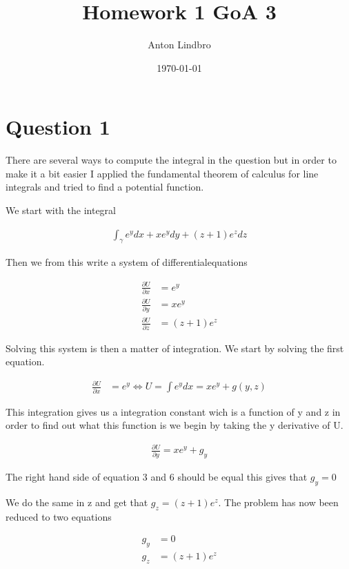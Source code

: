 \documentclass[a4paper]{article}
\title{Homework 1 GoA 3}
\author{Anton Lindbro}
\date{\today}
\begin{document}
\maketitle

\section*{Question 1}

There are several ways to compute the integral in the question but in order to make it a bit easier I applied the fundamental theorem of calculus for line integrals and tried to find a potential function. 

We start with the integral

\begin{align}
    \int_{\gamma} e^y dx + xe^y dy + (z+1)e^z dz 
\end{align}

Then we from this write a system of differentialequations

\begin{align}
    \frac{\partial U}{\partial x} &= e^y \\
    \frac{\partial U}{\partial y} &= xe^y \\ 
    \frac{\partial U}{\partial z} &= (z+1)e^z 
\end{align}

Solving this system is then a matter of integration. We start by solving the first equation.

\begin{align}
    \frac{\partial U}{\partial x} &= e^y \Leftrightarrow U = \int e^y dx = xe^y + g(y,z)
\end{align}

This integration gives us a integration constant wich is a function of y and z in order to find out what this function is we begin by taking the y derivative of U.

\begin{align}
    \frac{\partial U}{\partial y} = xe^y + g_y 
\end{align}

The right hand side of equation 3 and 6 should be equal this gives that $g_y = 0$ 

We do the same in z and get that $g_z = (z+1)e^z$. The problem has now been reduced to two equations

\begin{align}
    g_y &= 0 \\
    g_z &= (z+1)e^z 
\end{align}
\end{document}

